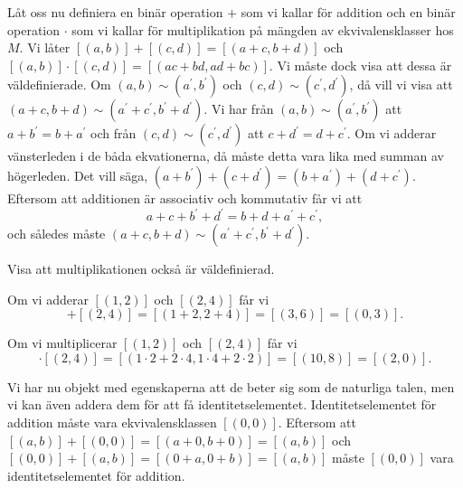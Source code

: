 Låt oss nu definiera en binär operation \(+\) som vi kallar för addition och en
binär operation \(\cdot\) som vi kallar för multiplikation på mängden av
ekvivalensklasser hos \(M\).
Vi låter \([(a,b)]+[(c,d)] = [(a+c, b+d)]\) och \([(a,b)]\cdot [(c,d)] =
[(ac+bd, ad+bc)]\).
Vi måste dock visa att dessa är väldefinierade.
Om \((a,b)\sim (a^\prime, b^\prime)\) och \((c,d)\sim (c^\prime,
d^\prime)\), då vill vi visa att \((a+c, b+d)\sim (a^\prime+c^\prime,
b^\prime+d^\prime)\).
Vi har från \((a,b)\sim (a^\prime,b^\prime)\) att \(a+b^\prime =
b+a^\prime\) och från \((c,d)\sim (c^\prime,d^\prime)\) att
\(c+d^\prime=d+c^\prime\).
Om vi adderar vänsterleden i de båda ekvationerna, då måste detta vara lika
med summan av högerleden.
Det vill säga, \((a+b^\prime) + (c+d^\prime) = (b+a^\prime) +
(d+c^\prime)\).
Eftersom att additionen är associativ och kommutativ får vi att
\begin{equation*}
  a+c+b^\prime+d^\prime = b+d+a^\prime+c^\prime,
\end{equation*}
och således måste \((a+c,b+d)\sim (a^\prime+c^\prime, b^\prime+d^\prime)\).
\begin{exercise}
  Visa att multiplikationen också är väldefinierad.
\end{exercise}

\begin{example}\label{ex:HeltalAddition}
  Om vi adderar \([(1,2)]\) och \([(2,4)]\) får vi
  \begin{equation*}
    [(1,2)]+[(2,4)] = [(1+2,2+4)] = [(3, 6)] = [(0,3)].
  \end{equation*}
\end{example}
\begin{example}\label{ex:HeltalMultiplikation}
  Om vi multiplicerar \([(1,2)]\) och \([(2,4)]\) får vi
  \begin{equation*}
    [(1,2)]\cdot [(2,4)] = [(1\cdot 2 + 2\cdot 4, 1\cdot 4 + 2\cdot 2)] =
    [(10, 8)] = [(2,0)].
  \end{equation*}
\end{example}

Vi har nu objekt med egenskaperna att de beter sig som de naturliga talen, men
vi kan även addera dem för att få identitetselementet.
Identitetselementet för addition måste vara ekvivalensklassen \([(0,0)]\).
Eftersom att \([(a,b)]+[(0,0)] = [(a+0,b+0)] = [(a,b)]\) och
\([(0,0)]+[(a,b)] = [(0+a,0+b)] = [(a,b)]\) måste \([(0,0)]\)
vara identitetselementet för addition.

